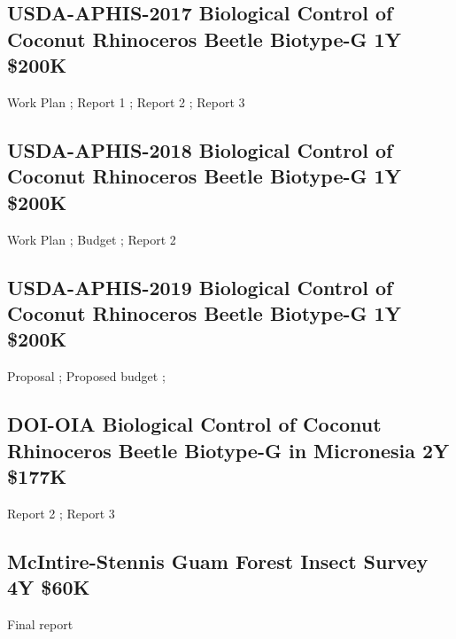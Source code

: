\subsection{USDA-APHIS-2017 Biological Control of Coconut Rhinoceros Beetle Biotype-G 1Y \$200K}
\label{USDA-APHIS-2017}
\begin{refsection}

Work Plan \cite{moore_fy17_2018}; 
Report 1 \cite{moore_usda_2018}; 
Report 2 \cite{moore_usda_2018-1}; 
Report 3 \cite{moore_usda_2019}		

	\printbibliography[heading=none]
\end{refsection}

\subsection{USDA-APHIS-2018 Biological Control of Coconut Rhinoceros Beetle Biotype-G 1Y \$200K}
\label{USDA-APHIS-2018}
\begin{refsection}

Work Plan \cite{moore_farm_2018-1}; 
Budget \cite{moore_fy18_2018}; 
Report 2 \cite{moore_usda_2019-1}

	\printbibliography[heading=none]
\end{refsection}

\subsection{USDA-APHIS-2019 Biological Control of Coconut Rhinoceros Beetle Biotype-G 1Y \$200K}
\label{USDA-APHIS-2019}
\begin{refsection}
Proposal \cite{moore_fy19_2018};
Proposed budget \cite{moore_fy19_2018-1};

	\printbibliography[heading=none]
\end{refsection}

\subsection{DOI-OIA Biological Control of Coconut Rhinoceros Beetle Biotype-G in Micronesia 2Y \$177K}
\label{DOI}
\begin{refsection}
Report 2 \cite{moore_doi-oia_2018};
Report 3 \cite{moore_doi-oia_2019}
		
	\printbibliography[heading=none]
\end{refsection}

\subsection{McIntire-Stennis Guam Forest Insect Survey 4Y \$60K}
\label{McIntire-Stennis Guam Forest Insect Survey}
\begin{refsection}
Final report \cite{moore_aubreymoore/mcintire-stennis_2018}

	\printbibliography[heading=none]
\end{refsection}

